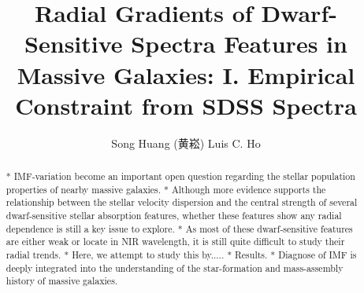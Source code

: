 \documentclass[preprint]{aastex}
\begin{document}
\begin{CJK*}{UTF8}{gbsn}


\title{Radial Gradients of Dwarf-Sensitive Spectra Features in Massive Galaxies: 
    I. Empirical Constraint from SDSS Spectra}

\author{Song Huang (黄崧) Luis C. Ho}
\date{}                                          








\begin{abstract}

* IMF-variation become an important open question regarding the stellar 
  population properties of nearby massive galaxies.  
* Although more evidence supports the relationship between the stellar 
  velocity dispersion and the central strength of several dwarf-sensitive 
  stellar absorption features, whether these features show any radial
  dependence is still a key issue to explore.  
* As most of these dwarf-sensitive features are either weak or locate in 
  NIR wavelength, it is still quite difficult to study their radial trends.
* Here, we attempt to study this by.....
* Results.   
* Diagnose of IMF is deeply integrated into the understanding of the 
  star-formation and mass-assembly history of massive galaxies. 
  
\end{abstract}



\end{CJK*}
\end{document}
